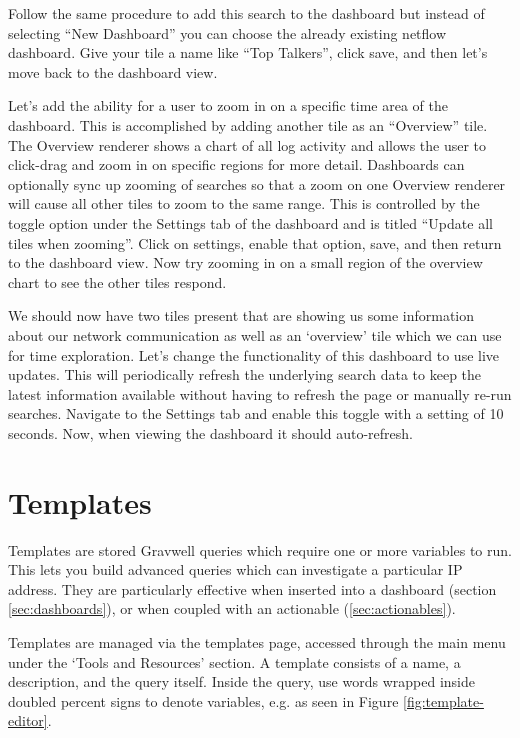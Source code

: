 Follow the same procedure to add this search to the dashboard but
instead of selecting ``New Dashboard'' you can choose the already
existing netflow dashboard. Give your tile a name like ``Top Talkers'',
click save, and then let's move back to the dashboard view.

Let's add the ability for a
user to zoom in on a specific time area of the dashboard. This is
accomplished by adding another tile as an ``Overview'' tile. The
Overview renderer shows a chart of all log activity and allows the user
to click-drag and zoom in on specific regions for more detail.
Dashboards can optionally sync up zooming of searches so that a zoom on
one Overview renderer will cause all other tiles to zoom to the same
range. This is controlled by the toggle option under the Settings tab of
the dashboard and is titled ``Update all tiles when zooming''. Click on
settings, enable that option, save, and then return to the dashboard
view. Now try zooming in on a small region of the overview chart to see
the other tiles respond.

We should now have two tiles present that are showing us some
information about our network communication as well as an `overview'
tile which we can use for time exploration. Let's change the
functionality of this dashboard to use live updates. This will
periodically refresh the underlying search data to keep the latest
information available without having to refresh the page or manually
re-run searches. Navigate to the Settings tab and enable this toggle
with a setting of 10 seconds. Now, when viewing the dashboard it should
auto-refresh.


\section{Templates}

Templates are stored Gravwell queries which require one or more variables to run. This lets you build advanced queries which can investigate a particular IP address. They are particularly effective when inserted into a dashboard (section \ref{sec:dashboards}), or when coupled with an actionable (\ref{sec:actionables}).

Templates are managed via the templates page, accessed through the main menu under the `Tools and Resources' section. A template consists of a name, a description, and the query itself. Inside the query, use words wrapped inside doubled percent signs to denote variables, e.g.  as seen in Figure \ref{fig:template-editor}.

